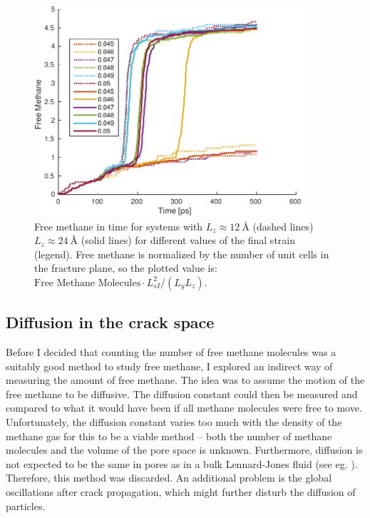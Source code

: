 \begin{figure}
\centering
\includegraphics[width=10cm]{../figures/thesis/free_methane_nz1_nz2.pdf}
\caption{Free methane in time for systems with $L_z \approx \SI{12}{\angstrom}$ (dashed lines) $L_z\approx \SI{24}{\angstrom}$ (solid lines) for different values of the final strain (legend). Free methane is normalized by the number of unit cells in the fracture plane, so the plotted value is: $\text{Free Methane Molecules}\cdot L_{sI}^2/(L_yL_z)$.}
\label{fig:free_methane_diff_l}
\end{figure}

\subsection{Diffusion in the crack space}
Before I decided that counting the number of free methane molecules was a suitably good method to study free methane, I explored an indirect way of measuring the amount of free methane. The idea was to assume the motion of the free methane to be diffusive. The diffusion constant could then be measured and compared to what it would have been if all methane molecules were free to move. Unfortunately, the diffusion constant varies too much with the density of the methane gas for this to be a viable method -- both the number of methane molecules and the volume of the pore space is unknown. Furthermore, diffusion is not expected to be the same in pores as in a bulk Lennard-Jones fluid (see eg. \citet[p. 18]{Pozhar:1668293}). Therefore, this method was discarded. An additional problem is the global oscillations after crack propagation, which might further disturb the diffusion of particles. 

